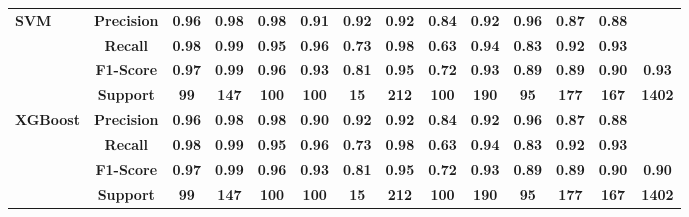 \begin{table}[h]
{\begin{tabular}{lccccccccccccc}
        \textbf{SVM} & \textbf{Precision} & \textbf{0.96} & \textbf{0.98} & \textbf{0.98} & \textbf{0.91} & \textbf{0.92} & \textbf{0.92} & \textbf{0.84} & \textbf{0.92} & \textbf{0.96} & \textbf{0.87} & \textbf{0.88} & \textbf{}\\
        \textbf{} & \textbf{Recall} & \textbf{0.98} & \textbf{0.99} & \textbf{0.95} & \textbf{0.96} & \textbf{0.73} & \textbf{0.98} & \textbf{0.63} & \textbf{0.94} & \textbf{0.83} & \textbf{0.92} & \textbf{0.93} & \textbf{}\\
        \textbf{} & \textbf{F1-Score} & \textbf{0.97} & \textbf{0.99} & \textbf{0.96} & \textbf{0.93} & \textbf{0.81} & \textbf{0.95} & \textbf{0.72} & \textbf{0.93} & \textbf{0.89} & \textbf{0.89} & \textbf{0.90} & \textbf{0.93}\\
        \textbf{} & \textbf{Support} & \textbf{99} & \textbf{147} & \textbf{100} & \textbf{100} & \textbf{15} & \textbf{212} & \textbf{100} & \textbf{190} & \textbf{95} & \textbf{177} & \textbf{167} & \textbf{1402}\\

        \midrule

        \textbf{XGBoost} & \textbf{Precision} & \textbf{0.96} & \textbf{0.98} & \textbf{0.98} & \textbf{0.90} & \textbf{0.92} & \textbf{0.92} & \textbf{0.84} & \textbf{0.92} & \textbf{0.96} & \textbf{0.87} & \textbf{0.88} & \textbf{}\\
        \textbf{} & \textbf{Recall} & \textbf{0.98} & \textbf{0.99} & \textbf{0.95} & \textbf{0.96} & \textbf{0.73} & \textbf{0.98} & \textbf{0.63} & \textbf{0.94} & \textbf{0.83} & \textbf{0.92} & \textbf{0.93} & \textbf{}\\
        \textbf{} & \textbf{F1-Score} & \textbf{0.97} & \textbf{0.99} & \textbf{0.96} & \textbf{0.93} & \textbf{0.81} & \textbf{0.95} & \textbf{0.72} & \textbf{0.93} & \textbf{0.89} & \textbf{0.89} & \textbf{0.90} & \textbf{0.90}\\
        \textbf{} & \textbf{Support} & \textbf{99} & \textbf{147} & \textbf{100} & \textbf{100} & \textbf{15} & \textbf{212} & \textbf{100} & \textbf{190} & \textbf{95} & \textbf{177} & \textbf{167} & \textbf{1402}\\

        \midrule


\end{tabular}}
\end{table}
